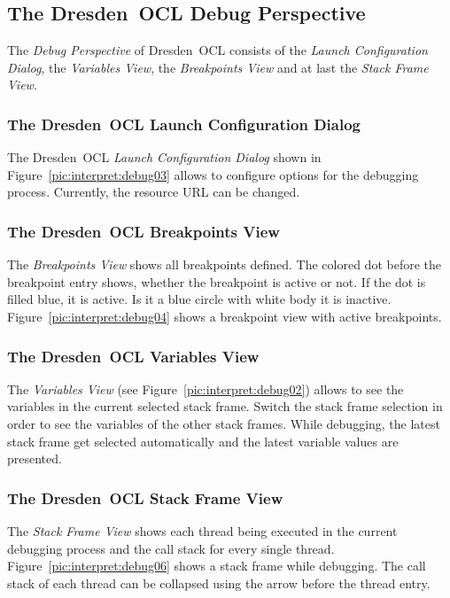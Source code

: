 \subsection{The Dresden~OCL Debug Perspective}

The \emph{Debug Perspective} of Dresden~OCL consists of the \emph{Launch Configuration Dialog},
the \emph{Variables View}, the \emph{Breakpoints View} and at last the \emph{Stack Frame View}.

\subsubsection{The Dresden~OCL Launch Configuration Dialog}

The Dresden~OCL \emph{Launch Configuration Dialog} shown in Figure~\ref{pic:interpret:debug03} allows
to configure options for the debugging process. Currently, the resource URL can
be changed.

\subsubsection{The Dresden~OCL Breakpoints View}

The \emph{Breakpoints View} shows all breakpoints defined.
The colored dot before the breakpoint entry shows, whether the breakpoint is active or not.
If the dot is filled blue, it is active. Is it a blue circle with white body it is inactive.
Figure~\ref{pic:interpret:debug04} shows a breakpoint view with active breakpoints.

\subsubsection{The Dresden~OCL Variables View}

The \emph{Variables View} (see Figure~\ref{pic:interpret:debug02})
allows to see the variables in the current selected stack frame.
Switch the stack frame selection in order to see the variables of the other stack frames.
While debugging, the latest stack frame get selected automatically and the
latest variable values are presented.

\subsubsection{The Dresden~OCL Stack Frame View}
The \emph{Stack Frame View} shows each thread being executed in the current debugging process
and the call stack for every single thread. Figure~\ref{pic:interpret:debug06} shows a stack
frame while debugging. The call stack of each thread can be collapsed using the arrow before the thread entry.

